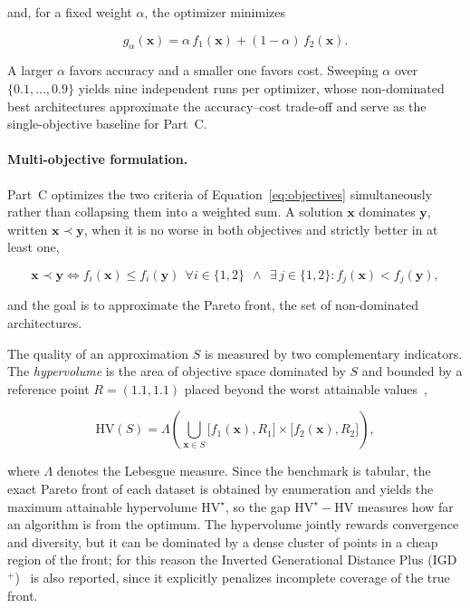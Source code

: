 and, for a fixed weight $\alpha$, the optimizer minimizes

\begin{equation}
    g_\alpha(\mathbf{x}) = \alpha\, f_1(\mathbf{x}) + (1-\alpha)\, f_2(\mathbf{x}).
    \label{eq:scalar}
\end{equation}

A larger $\alpha$ favors accuracy and a smaller one favors cost. Sweeping $\alpha$ over $\{0.1, \dots, 0.9\}$ yields nine independent runs per optimizer, whose non-dominated best architectures approximate the accuracy--cost trade-off and serve as the single-objective baseline for Part~C.

\paragraph{Multi-objective formulation.}
Part~C optimizes the two criteria of Equation~\eqref{eq:objectives} simultaneously rather than collapsing them into a weighted sum. A solution $\mathbf{x}$ dominates $\mathbf{y}$, written $\mathbf{x} \prec \mathbf{y}$, when it is no worse in both objectives and strictly better in at least one,

\begin{equation}
    \mathbf{x} \prec \mathbf{y} \iff f_i(\mathbf{x}) \le f_i(\mathbf{y})\ \ \forall i \in \{1,2\} \ \ \wedge\ \ \exists\, j \in \{1,2\}: f_j(\mathbf{x}) < f_j(\mathbf{y}),
    \label{eq:dominance}
\end{equation}

and the goal is to approximate the Pareto front, the set of non-dominated architectures.

The quality of an approximation $S$ is measured by two complementary indicators. The \emph{hypervolume} is the area of objective space dominated by $S$ and bounded by a reference point $R = (1.1, 1.1)$ placed beyond the worst attainable values~\cite{zitzler1999hv},

\begin{equation}
    \mathrm{HV}(S) = \Lambda\!\left( \bigcup_{\mathbf{x}\in S} \big[f_1(\mathbf{x}), R_1\big] \times \big[f_2(\mathbf{x}), R_2\big] \right),
    \label{eq:hv}
\end{equation}

where $\Lambda$ denotes the Lebesgue measure. Since the benchmark is tabular, the exact Pareto front of each dataset is obtained by enumeration and yields the maximum attainable hypervolume $\mathrm{HV}^{\star}$, so the gap $\mathrm{HV}^{\star} - \mathrm{HV}$ measures how far an algorithm is from the optimum. The hypervolume jointly rewards convergence and diversity, but it can be dominated by a dense cluster of points in a cheap region of the front; for this reason the Inverted Generational Distance Plus (IGD$^{+}$)~\cite{ishibuchi2015igdplus} is also reported, since it explicitly penalizes incomplete coverage of the true front.

